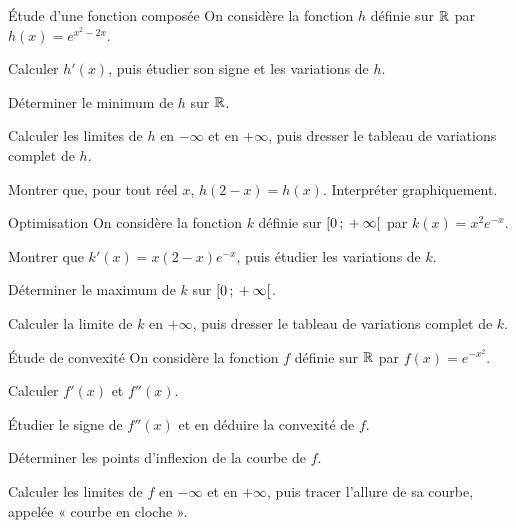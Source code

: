 \begin{exercice}[3]{Étude d'une fonction composée}
On considère la fonction $h$ définie sur $\mathbb{R}$ par $h(x)=e^{x^{2}-2x}$.
\begin{questions}
  \item Calculer $h'(x)$, puis étudier son signe et les variations de $h$.
  \item Déterminer le minimum de $h$ sur $\mathbb{R}$.
  \item Calculer les limites de $h$ en $-\infty$ et en $+\infty$, puis dresser le tableau de variations complet de $h$.
  \item Montrer que, pour tout réel $x$, $h(2-x)=h(x)$. Interpréter graphiquement.
\end{questions}
\end{exercice}

\begin{exercice}[2]{Optimisation}
On considère la fonction $k$ définie sur $\mathopen{[}0\,{;}\,+\infty\mathclose{[}$ par $k(x)=x^{2}e^{-x}$.
\begin{questions}
  \item Montrer que $k'(x)=x(2-x)e^{-x}$, puis étudier les variations de $k$.
  \item Déterminer le maximum de $k$ sur $\mathopen{[}0\,{;}\,+\infty\mathclose{[}$.
  \item Calculer la limite de $k$ en $+\infty$, puis dresser le tableau de variations complet de $k$.
\end{questions}
\end{exercice}

\begin{exercice}[3]{Étude de convexité}
On considère la fonction $f$ définie sur $\mathbb{R}$ par $f(x)=e^{-x^{2}}$.
\begin{questions}
  \item Calculer $f'(x)$ et $f''(x)$.
  \item Étudier le signe de $f''(x)$ et en déduire la convexité de $f$.
  \item Déterminer les points d'inflexion de la courbe de $f$.
  \item Calculer les limites de $f$ en $-\infty$ et en $+\infty$, puis tracer l'allure de sa courbe, appelée « courbe en cloche ».
\end{questions}
\end{exercice}


